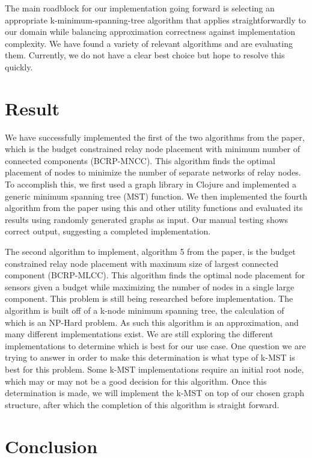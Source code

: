 \documentclass{article}
\begin{document}
The main roadblock for our implementation going forward is selecting an appropriate k-minimum-spanning-tree algorithm that applies straightforwardly to our domain while balancing approximation correctness against implementation complexity. We have found a variety of relevant algorithms and are evaluating them. Currently, we do not have a clear best choice but hope to resolve this quickly.

\section{Result}
We have successfully implemented the first of the two algorithms from the paper, which is the budget constrained relay node placement with minimum number of connected components (BCRP-MNCC). This algorithm finds the optimal placement of nodes to minimize the number of separate networks of relay nodes. To accomplish this, we first used a graph library in Clojure and implemented a generic minimum spanning tree (MST) function. We then implemented the fourth algorithm from the paper using this and other utility functions and evaluated its results using randomly generated graphs as input. Our manual testing shows correct output, suggesting a completed implementation.

The second algorithm to implement, algorithm 5 from the paper, is the budget constrained relay node placement with maximum size of largest connected component (BCRP-MLCC). This algorithm finds the optimal node placement for sensors given a budget while maximizing the number of nodes in a single large component. This problem is still being researched before implementation. The algorithm is built off of a k-node minimum spanning tree, the calculation of which is an NP-Hard problem. As such this algorithm is an approximation, and many different implementations exist. We are still exploring the different implementations to determine which is best for our use case. One question we are trying to answer in order to make this determination is what type of k-MST is best for this problem. Some k-MST implementations require an initial root node, which may or may not be a good decision for this algorithm. Once this determination is made, we will implement the k-MST on top of our chosen graph structure, after which the completion of this algorithm is straight forward.

\section{Conclusion}
\end{document}
